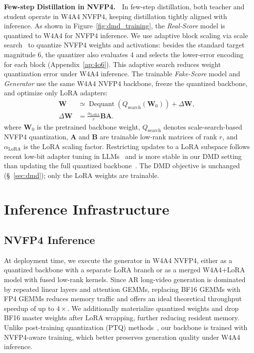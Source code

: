 \documentclass{llmxive}
\begin{document}
\textbf{Few-step Distillation in NVFP4.} $\;$
In few-step distillation, both teacher and student operate in W4A4 NVFP4, keeping distillation tightly aligned with inference. As shown in Figure~\ref{fig:dmd_training}, the \textit{Real-Score} model is quantized to W4A4 for NVFP4 inference. We use adaptive block scaling via scale search~\cite{cook2025four} to quantize NVFP4 weights and activations: besides the standard target magnitude 6, the quantizer also evaluates 4 and selects the lower-error encoding for each block (Appendix~\ref{ap:4o6}). This adaptive search reduces weight quantization error under W4A4 inference. The trainable \textit{Fake-Score} model and \textit{Generator} use the same W4A4 NVFP4 backbone, freeze the quantized backbone, and optimize only LoRA adapters:
\begin{equation}
\begin{aligned}
\mathbf{W}
&\simeq
\operatorname{Dequant}\!\left(Q_{\mathrm{search}}(\mathbf{W}_0)\right)
+ \Delta \mathbf{W}, \\
\Delta \mathbf{W}
&=
\frac{\alpha_{\mathrm{LoRA}}}{r}\mathbf{B}\mathbf{A}.
\end{aligned}
\end{equation}
where $\mathbf{W}_0$ is the pretrained backbone weight, $Q_{\mathrm{search}}$ denotes scale-search-based NVFP4 quantization, $\mathbf{A}$ and $\mathbf{B}$ are trainable low-rank matrices of rank $r$, and $\alpha_{\mathrm{LoRA}}$ is the LoRA scaling factor. Restricting updates to a LoRA subspace follows recent low-bit adapter tuning in LLMs~\cite{dettmers2023qlora,huang2025qerl} and is more stable in our DMD setting than updating the full quantized backbone~\cite{yang2025longlive,zhu2026causal,huang2025self}. The DMD objective is unchanged (\S~\ref{sec:dmd}); only the LoRA weights are trainable. 


\section{Inference Infrastructure}
\subsection{NVFP4 Inference}\label{sec:nvfp4_inference}
At deployment time, we execute the generator in W4A4 NVFP4, either as a quantized backbone with a separate LoRA branch or as a merged W4A4+LoRA model with fused low-rank kernels. Since AR long-video generation is dominated by repeated linear layers and attention GEMMs, replacing BF16 GEMMs with FP4 GEMMs reduces memory traffic and offers an ideal theoretical throughput speedup of up to $4\times$. We additionally materialize quantized weights and drop BF16 master weights after LoRA wrapping, further reducing resident memory. Unlike post-training quantization (PTQ) methods~\cite{zandieh2025turboquant,li2024svdquant,zhao2024vidit}, our backbone is trained with NVFP4-aware training, which better preserves generation quality under W4A4 inference.
\end{document}
